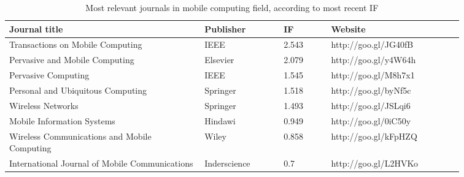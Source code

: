 \documentclass{scrartcl}
\begin{document}
\begin{table}[t]
\centering
\scriptsize{}
\begin{tabular}{C{0.37\linewidth}C{0.15\linewidth}C{0.09\linewidth}C{0.25\linewidth}}
\toprule
\textbf{Journal title}                                 & \textbf{Publisher} & \textbf{IF} & \textbf{Website}     \\ \midrule

Transactions on Mobile Computing               & IEEE               & 2.543                  & http://goo.gl/JG40fB \\
\cmidrule(l){1-4}

Pervasive and Mobile Computing                 & Elsevier           & 2.079                  & http://goo.gl/y4W64h \\
\cmidrule(l){1-4}

Pervasive Computing                            & IEEE               & 1.545                  & http://goo.gl/M8h7x1 \\
\cmidrule(l){1-4}

Personal and Ubiquitous Computing              & Springer           & 1.518                  & http://goo.gl/byNf5c \\
\cmidrule(l){1-4}

Wireless Networks                              & Springer           & 1.493                  & http://goo.gl/JSLqi6 \\
\cmidrule(l){1-4}

Mobile Information Systems                     & Hindawi            & 0.949                  & http://goo.gl/0iC50y \\
\cmidrule(l){1-4}

Wireless Communications and Mobile Computing   & Wiley              & 0.858                  & http://goo.gl/kFpHZQ \\
\cmidrule(l){1-4}

International Journal of Mobile Communications & Inderscience       & 0.7                    & http://goo.gl/L2HVKo \\ \bottomrule
\end{tabular}
\caption{Most relevant journals in mobile computing field, according to most recent IF}
\label{tbl:journals}
\end{table}

\clearpage


\end{document}

